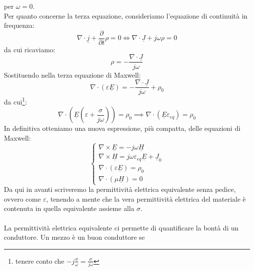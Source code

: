 \documentclass{book}
\begin{document}
            per $\omega = 0$. \\
            Per quanto concerne la terza equazione, consideriamo l'equazione di continuità in frequenza:
            \begin{equation}
                \nabla \cdot \underline{j}+\frac{\partial}{\partial t}\rho = 0 \iff \nabla \cdot \underline{J}+j \omega \rho = 0
            \end{equation}
            da cui ricaviamo:
            \begin{equation}
                \rho = -\frac{\nabla \cdot \underline{J}}{j\omega}
            \end{equation}
            Sostituendo nella terza equazione di Maxwell:
            \begin{equation}
                \nabla \cdot (\varepsilon \underline{E}) = - \frac{\nabla \cdot \underline{J}}{j \omega}+\rho_{0}
            \end{equation}
            da cui\footnote{tenere conto che $-j \frac{\sigma}{\omega} = \frac{\sigma}{j \omega}$}:
            \begin{equation}
                \nabla \cdot (\underline{E}(\varepsilon+ \frac{\sigma}{j \omega})) = \rho_{0} \implies \nabla \cdot (\underline{E}\varepsilon_{eq})= \rho_{0}
            \end{equation}
        In definitiva otteniamo una nuova espressione, più compatta, delle equazioni di Maxwell:
        \begin{equation}
            \begin{cases}
            \nabla \times \underline{E} = -j \omega \underline{H} \\
            \nabla \times \underline{H} = j \omega \varepsilon_{{eq}}\underline{E}+\underline{J}_{0} \\
            \nabla \cdot (\varepsilon \underline{E}) = \rho_{0} \\
            \nabla \cdot (\mu \underline{H}) = 0
            \end{cases}
        \end{equation}
        Da qui in avanti scriveremo la permittività elettrica equivalente senza pedice, ovvero come $\varepsilon$, tenendo
        a mente che la vera permittività elettrica del materiale è contenuta in quella equivalente assieme alla $\sigma$. \\ \\
        La permittività elettrica equivalente ci permette di quantificare la bontà di un conduttore. Un mezzo è un buon conduttore se
\end{document}

